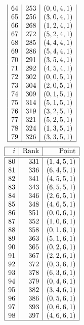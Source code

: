 \documentclass{article}
\begin{document}
{$$\begin{array}{|r|r|r|}
64 & 253 & ( 0, 0, 4, 1 )\\
65 & 256 & ( 3, 0, 4, 1 )\\
66 & 268 & ( 1, 2, 4, 1 )\\
67 & 272 & ( 5, 2, 4, 1 )\\
68 & 285 & ( 4, 4, 4, 1 )\\
69 & 286 & ( 5, 4, 4, 1 )\\
70 & 291 & ( 3, 5, 4, 1 )\\
71 & 292 & ( 4, 5, 4, 1 )\\
72 & 302 & ( 0, 0, 5, 1 )\\
73 & 304 & ( 2, 0, 5, 1 )\\
74 & 309 & ( 0, 1, 5, 1 )\\
75 & 314 & ( 5, 1, 5, 1 )\\
76 & 319 & ( 3, 2, 5, 1 )\\
77 & 321 & ( 5, 2, 5, 1 )\\
78 & 324 & ( 1, 3, 5, 1 )\\
79 & 326 & ( 3, 3, 5, 1 )\\
\hline
\end{array}
$$
$$
\begin{array}{|r|r|r|}
\hline
i & \mbox{Rank} & \mbox{Point} \\
\hline
\hline
80 & 331 & ( 1, 4, 5, 1 )\\
81 & 336 & ( 6, 4, 5, 1 )\\
82 & 341 & ( 4, 5, 5, 1 )\\
83 & 343 & ( 6, 5, 5, 1 )\\
84 & 346 & ( 2, 6, 5, 1 )\\
85 & 348 & ( 4, 6, 5, 1 )\\
86 & 351 & ( 0, 0, 6, 1 )\\
87 & 352 & ( 1, 0, 6, 1 )\\
88 & 358 & ( 0, 1, 6, 1 )\\
89 & 363 & ( 5, 1, 6, 1 )\\
90 & 365 & ( 0, 2, 6, 1 )\\
91 & 367 & ( 2, 2, 6, 1 )\\
92 & 372 & ( 0, 3, 6, 1 )\\
93 & 378 & ( 6, 3, 6, 1 )\\
94 & 379 & ( 0, 4, 6, 1 )\\
95 & 382 & ( 3, 4, 6, 1 )\\
96 & 386 & ( 0, 5, 6, 1 )\\
97 & 393 & ( 0, 6, 6, 1 )\\
98 & 397 & ( 4, 6, 6, 1 )\\
\hline
\end{array}
$$

}
\end{document}
